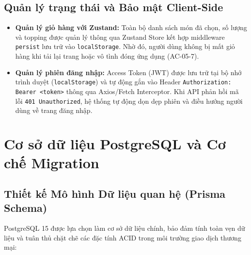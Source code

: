 \documentclass[11pt, a4paper]{article}
\begin{document}
\subsection{Quản lý trạng thái và Bảo mật Client-Side}

\begin{itemize}
	\item \textbf{Quản lý giỏ hàng với Zustand:} Toàn bộ danh sách món đã chọn, số lượng và topping được quản lý thông qua Zustand Store kết hợp middleware \texttt{persist} lưu trữ vào \texttt{localStorage}. Nhờ đó, người dùng không bị mất giỏ hàng khi tải lại trang hoặc vô tình đóng ứng dụng (AC-05-7).
	\item \textbf{Quản lý phiên đăng nhập:} Access Token (JWT) được lưu trữ tại bộ nhớ trình duyệt (\texttt{localStorage}) và tự động gắn vào Header \texttt{Authorization: Bearer <token>} thông qua Axios/Fetch Interceptor. Khi API phản hồi mã lỗi \texttt{401 Unauthorized}, hệ thống tự động dọn dẹp phiên và điều hướng người dùng về trang đăng nhập.
\end{itemize}

\section{Cơ sở dữ liệu PostgreSQL và Cơ chế Migration}

\subsection{Thiết kế Mô hình Dữ liệu quan hệ (Prisma Schema)}

PostgreSQL 15 được lựa chọn làm cơ sở dữ liệu chính, bảo đảm tính toàn vẹn dữ liệu và tuân thủ chặt chẽ các đặc tính ACID trong môi trường giao dịch thương mại:
\end{document}
